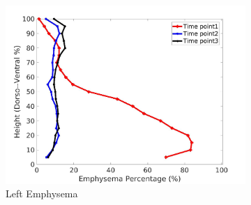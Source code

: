 \begin{figure}[H]
\begin{subfigure}{.42\linewidth}
  \includegraphics[width=\linewidth,trim={{.0\wd0} {.0\wd0} {.0\wd0} {.0\wd0}},clip]{Appendix/Image_AppexA/DorsoToVentral/IPF15LeftLungEmphysemaDiseaseDorsoToVentral.jpg} %
  \caption{Left Emphysema}
  \label{fig:IPF15DiseaseDorsoToVentral-g} 
\end{subfigure} 
\begin{subfigure}{.42\linewidth}%

\end{subfigure}
\end{figure}
